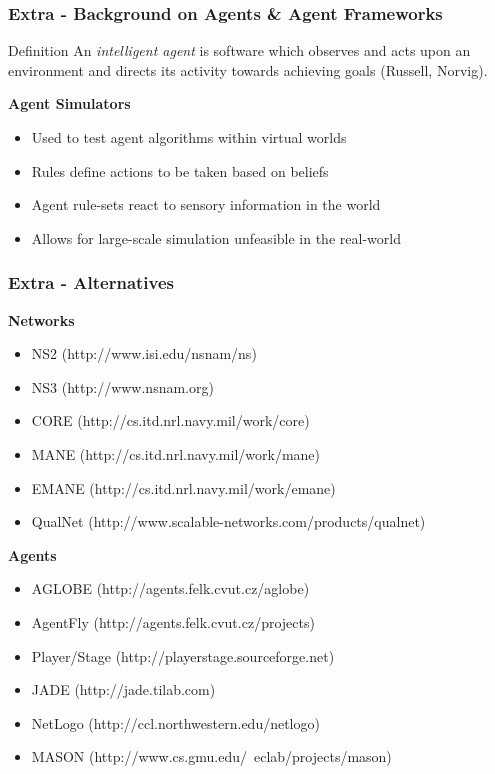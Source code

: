 \documentclass[mathserif,usenames,dvipsnames]{beamer}
\begin{document}
\frame
{
    \frametitle{Extra - Background on Agents \& Agent Frameworks}
    \begin{block}{Definition}
    An \emph{intelligent agent} is software which observes and acts upon an environment and directs its activity towards achieving goals (Russell, Norvig).
    \end{block}

    \textbf{Agent Simulators}
    \begin{itemize}
        \item Used to test agent algorithms within virtual worlds
        \item Rules define actions to be taken based on beliefs
        \item Agent rule-sets react to sensory information in the world
        \item Allows for large-scale simulation unfeasible in the real-world
    \end{itemize}
}


\frame
{
    \frametitle{Extra - Alternatives}
    \footnotesize
    \textbf{Networks}
    \begin{itemize}
        \item NS2 (http://www.isi.edu/nsnam/ns)
        \item NS3 (http://www.nsnam.org)
        \item CORE (http://cs.itd.nrl.navy.mil/work/core)
        \item MANE (http://cs.itd.nrl.navy.mil/work/mane)
        \item EMANE (http://cs.itd.nrl.navy.mil/work/emane)
        \item QualNet (http://www.scalable-networks.com/products/qualnet)
    \end{itemize}

    \textbf{Agents}
    \begin{itemize}
        \item AGLOBE (http://agents.felk.cvut.cz/aglobe)
        \item AgentFly (http://agents.felk.cvut.cz/projects)
        \item Player/Stage (http://playerstage.sourceforge.net)
        \item JADE (http://jade.tilab.com)
        \item NetLogo (http://ccl.northwestern.edu/netlogo)
        \item MASON (http://www.cs.gmu.edu/~eclab/projects/mason)
    \end{itemize}
}
\end{document}
